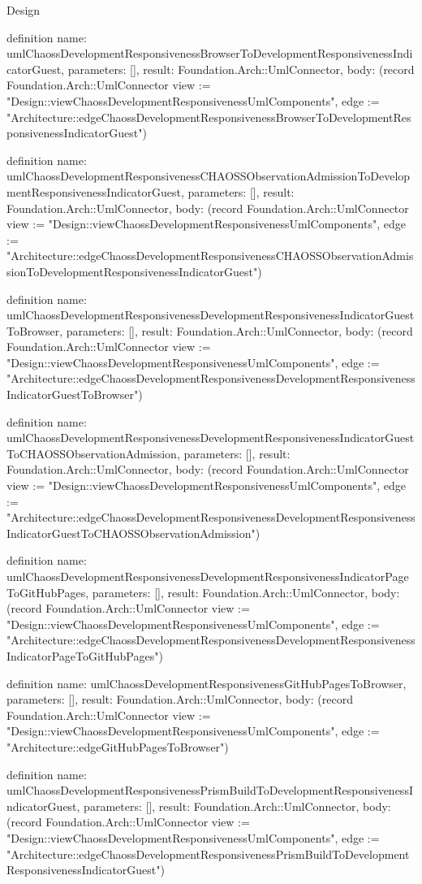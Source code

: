 \begin{lexlean}{Design}
\begin{semanticmodule}
definition{
  name: umlChaossDevelopmentResponsivenessBrowserToDevelopmentResponsivenessIndicatorGuest,
  parameters: [],
  result: Foundation.Arch::UmlConnector,
  body: (record Foundation.Arch::UmlConnector {view := "Design::viewChaossDevelopmentResponsivenessUmlComponents", edge := "Architecture::edgeChaossDevelopmentResponsivenessBrowserToDevelopmentResponsivenessIndicatorGuest"})
}

definition{
  name: umlChaossDevelopmentResponsivenessCHAOSSObservationAdmissionToDevelopmentResponsivenessIndicatorGuest,
  parameters: [],
  result: Foundation.Arch::UmlConnector,
  body: (record Foundation.Arch::UmlConnector {view := "Design::viewChaossDevelopmentResponsivenessUmlComponents", edge := "Architecture::edgeChaossDevelopmentResponsivenessCHAOSSObservationAdmissionToDevelopmentResponsivenessIndicatorGuest"})
}

definition{
  name: umlChaossDevelopmentResponsivenessDevelopmentResponsivenessIndicatorGuestToBrowser,
  parameters: [],
  result: Foundation.Arch::UmlConnector,
  body: (record Foundation.Arch::UmlConnector {view := "Design::viewChaossDevelopmentResponsivenessUmlComponents", edge := "Architecture::edgeChaossDevelopmentResponsivenessDevelopmentResponsivenessIndicatorGuestToBrowser"})
}

definition{
  name: umlChaossDevelopmentResponsivenessDevelopmentResponsivenessIndicatorGuestToCHAOSSObservationAdmission,
  parameters: [],
  result: Foundation.Arch::UmlConnector,
  body: (record Foundation.Arch::UmlConnector {view := "Design::viewChaossDevelopmentResponsivenessUmlComponents", edge := "Architecture::edgeChaossDevelopmentResponsivenessDevelopmentResponsivenessIndicatorGuestToCHAOSSObservationAdmission"})
}

definition{
  name: umlChaossDevelopmentResponsivenessDevelopmentResponsivenessIndicatorPageToGitHubPages,
  parameters: [],
  result: Foundation.Arch::UmlConnector,
  body: (record Foundation.Arch::UmlConnector {view := "Design::viewChaossDevelopmentResponsivenessUmlComponents", edge := "Architecture::edgeChaossDevelopmentResponsivenessDevelopmentResponsivenessIndicatorPageToGitHubPages"})
}

definition{
  name: umlChaossDevelopmentResponsivenessGitHubPagesToBrowser,
  parameters: [],
  result: Foundation.Arch::UmlConnector,
  body: (record Foundation.Arch::UmlConnector {view := "Design::viewChaossDevelopmentResponsivenessUmlComponents", edge := "Architecture::edgeGitHubPagesToBrowser"})
}

definition{
  name: umlChaossDevelopmentResponsivenessPrismBuildToDevelopmentResponsivenessIndicatorGuest,
  parameters: [],
  result: Foundation.Arch::UmlConnector,
  body: (record Foundation.Arch::UmlConnector {view := "Design::viewChaossDevelopmentResponsivenessUmlComponents", edge := "Architecture::edgeChaossDevelopmentResponsivenessPrismBuildToDevelopmentResponsivenessIndicatorGuest"})
}


\end{semanticmodule}
\end{lexlean}
